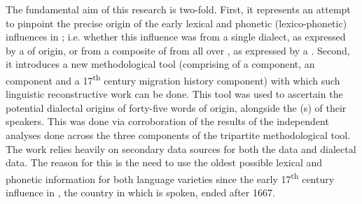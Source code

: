 The fundamental aim of this research is two-fold. First, it represents an attempt to pinpoint the precise origin of the early  lexical and phonetic (lexico-phonetic) influences in ; i.e. whether this influence was from a single dialect, as expressed by a  of origin, or from a composite of  from all over , as expressed by a . Second, it introduces a new methodological tool (comprising of a  component, an   component and a 17\textsuperscript{th} century  migration history component) with which such linguistic reconstructive work can be done. This tool was used to ascertain the potential dialectal origins of forty-five  words of  origin, alongside the (s) of their speakers. This was done via corroboration of the results of the independent analyses done across the three components of the tripartite methodological tool. The work relies heavily on secondary data sources for both the  data and  dialectal data. The reason for this is the need to use the oldest possible lexical and phonetic information for both language varieties since the early 17\textsuperscript{th} century  influence in , the country in which  is spoken, ended after 1667.
 

